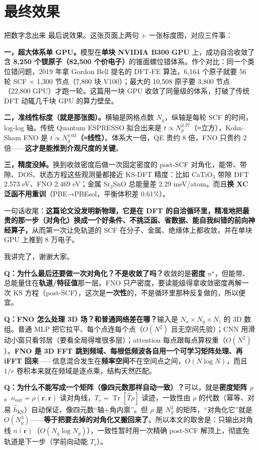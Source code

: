 \documentclass[11pt, a4paper, fontset=none]{ctexart}
\newcommand{\hl}[1]{{\color{key}\bfseries #1}}
\begin{document}
\section{最终效果}\label{sec:s8}

\begin{say}{把数字念出来}
最后说效果。这张页面上两句 + 一张标度图，对应三件事：

\textbf{一，超大体系单 GPU。}模型在\hl{单块 NVIDIA B300 GPU} 上，成功自洽收敛了含 \hl{8,250 个镁原子（82,500 个价电子）}的锥面螺位错体系。作个对比：同一个类位错问题，2019 年拿 Gordon Bell 提名的 DFT-FE 算法，6,164 个原子就要 56 轮 SCF × 1,300 节点（7,800 块 V100）；最大的 10,508 原子要 3,800 节点（22,800 GPU）才跑一轮。这篇用一块 GPU 收敛了同量级的体系，打破了传统 DFT 动辄几千块 GPU 的算力壁垒。

\textbf{二，准线性标度（就是那张图）。}横轴是网格点数 $N_g$，纵轴是每轮 SCF 的时间，log-log 轴。传统 Quantum ESPRESSO 拟合出来是 $t\propto N_g^{3.37}$（≈立方），Kohn--Sham FNO 是 \hl{$t\propto N_g^{1.03}$（≈线性）}。体系大一倍，QE 贵约 8 倍，FNO 只贵约 2 倍——\hl{这才是能推到介观尺度的关键}。

\textbf{三，精度没掉。}换到收敛密度后做一次固定密度的 post-SCF 对角化，能带、带隙、DOS、状态方程这些观测量都接近 KS-DFT 精度：比如 CaTiO$_3$ 带隙 DFT 2.573 eV、FNO 2.469 eV；金属 Sr$_3$SnO 总能量差 2.29 meV/atom。而且\hl{换 XC 泛函不用重训}（PBE→PBEsol，平衡体积差 0.61\%）。

一句话收尾：\hl{这篇论文没发明新物理，它是在 DFT 的自洽循环里，精准地把最贵的那一步（对角化）换成一个好条件、不挑泛函、省数据、能自我纠错的前向神经算子，}从而第一次让免轨道的 SCF 在分子、金属、绝缘体上都收敛，并在单块 GPU 上推到 8 万电子。

我讲完了，谢谢大家。
\end{say}

\begin{say}[title={Q\&A 备用（如果被问到）}]
\textbf{Q：为什么最后还要做一次对角化？不是收敛了吗？}\quad 收敛的是\textbf{密度} $n^\star$，但能带、总能量住在\textbf{轨道/特征值}那一层。FNO 只产密度，要读能级得拿收敛密度再解一次 KS 方程（post-SCF），这次是\textbf{一次性}的，不是循环里那种反复做的，所以便宜。

\textbf{Q：FNO 怎么处理 3D 场？和普通网络差在哪？}\quad 输入是 $N_x\times N_y\times N_z$ 的 3D 数组。普通 MLP 把它拉平、每个点连每个点（$O(N^2)$ 且无空间先验）；CNN 用滑动小窗只看邻居（要看全局得堆很多层）；attention 每点跟每点算权重（$O(N^2)$）。\hl{FNO 是 3D FFT 跳到频域、每根低频波各自用一个可学习矩阵处理、再 iFFT 回来}——信息混合发生在\textbf{频率空间}不在空间点之间，$O(N\log N)$，而且 $1/r$ 卷积本来就在频域是逐点乘，结构天然匹配。

\textbf{Q：为什么不能写成一个矩阵（像四元数那样自动一致）？}\quad 可以，就是\hl{密度矩阵 $\rho$}。$n_{\text{out}}=\rho(\mathbf r,\mathbf r)$ 读对角线，$T_s=\operatorname{Tr}[\hat T\rho]$ 读迹，一致性由 $\rho$ 的代数（幂等、对易 $\hat h_{\text{KS}}$）自动保证，像四元数“轴+角内禀”。但 $\rho$ 是 $N_g^2$ 的矩阵，“对角化它”就是 $O(N_g^3)$——\hl{等于把要去掉的对角化又搬回来了}。所以本文的取舍是：只输出对角线 $n(\mathbf r)$（$O(N_g\log N_g)$），一致性暂时用一次精确 post-SCF 解顶上，彻底免轨道是下一步（学前向动能 $T_s$）。
\end{say}
\end{document}
